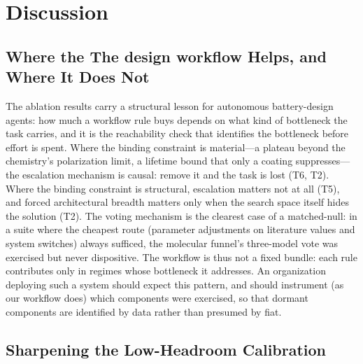 \section{Discussion}
\label{sec:discussion}

\subsection{Where the The design workflow Helps, and Where It Does Not}

The ablation results carry a structural lesson for autonomous battery-design
agents: how much a workflow rule buys depends on what kind of bottleneck the
task carries, and it is the reachability check that identifies the
bottleneck before effort is spent. Where the binding constraint is material---a plateau beyond the
chemistry's polarization limit, a lifetime bound that only a coating
suppresses---the escalation mechanism is causal: remove it and the task is
lost (T6, T2). Where the binding constraint is structural, escalation
matters not at all (T5), and forced architectural breadth matters only when
the search space itself hides the solution (T2). The voting mechanism is the
clearest case of a matched-null: in a suite where the cheapest route
(parameter adjustments on literature values and system switches) always
sufficed, the molecular
funnel's three-model vote was exercised but never dispositive.
The workflow is thus not a fixed bundle: each rule contributes only in
regimes whose bottleneck it addresses. An organization deploying such a
system should expect this pattern, and should instrument (as our workflow
does) which components were exercised, so that dormant components are
identified by data rather than presumed by fiat.

\subsection{Sharpening the Low-Headroom Calibration}

